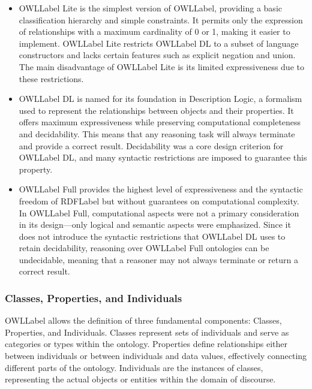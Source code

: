 \begin{itemize}
    \item \acrshort{OWLLabel} Lite is the simplest version of \acrshort{OWLLabel}, providing a basic classification hierarchy and simple constraints. It permits only the expression of relationships with a maximum cardinality of 0 or 1, making it easier to implement. \acrshort{OWLLabel} Lite restricts \acrshort{OWLLabel} DL to a subset of language constructors and lacks certain features such as explicit negation and union. The main disadvantage of \acrshort{OWLLabel} Lite is its limited expressiveness due to these restrictions.
    \item \acrshort{OWLLabel} DL is named for its foundation in Description Logic, a formalism used to represent the relationships between objects and their properties. It offers maximum expressiveness while preserving computational completeness and decidability. This means that any reasoning task will always terminate and provide a correct result. Decidability was a core design criterion for \acrshort{OWLLabel} DL, and many syntactic restrictions are imposed to guarantee this property.
    \item \acrshort{OWLLabel} Full provides the highest level of expressiveness and the syntactic freedom of \acrshort{RDFLabel} but without guarantees on computational complexity. In \acrshort{OWLLabel} Full, computational aspects were not a primary consideration in its design—only logical and semantic aspects were emphasized. Since it does not introduce the syntactic restrictions that \acrshort{OWLLabel} DL uses to retain decidability, reasoning over \acrshort{OWLLabel} Full ontologies can be undecidable, meaning that a reasoner may not always terminate or return a correct result.
\end{itemize}

\subsubsection{Classes, Properties, and Individuals}\label{II-subsubsec:classesProperties}

\acrshort{OWLLabel} allows the definition of three fundamental components: Classes, Properties, and Individuals. Classes represent sets of individuals and serve as categories or types within the ontology. Properties define relationships either between individuals or between individuals and data values, effectively connecting different parts of the ontology. Individuals are the instances of classes, representing the actual objects or entities within the domain of discourse.

